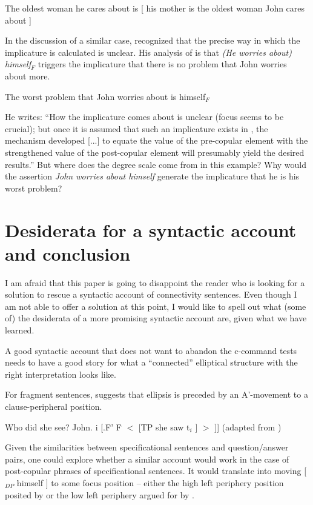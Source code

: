 \documentclass[output=paper,colorlinks,citecolor=brown,draft,draftmode]{langscibook}
\begin{document}
\ea \label{repp}The oldest woman he cares about is [ his mother is the oldest woman John cares about ]
\z

In the discussion of a similar case, \citet{schlenker2003clausalequation}  recognized that the precise way in which the implicature is calculated is unclear. His analysis of  is that  \textit{(He worries about) himself$_F$} triggers the implicature that  there is no problem that John worries about more.

\ea \label{theworstproblem}The worst problem that John worries about is himself$_F$
\z

He writes: ``How the implicature comes about is unclear (focus seems to be crucial); but once it is assumed that such an implicature exists in , the mechanism developed [...] to equate the value of the pre-copular element with the strengthened value of the post-copular element will presumably yield the desired results.'' But where does the degree scale come from in this example? Why would the assertion \textit{John worries about himself} generate  the implicature that he is his worst problem?


\section{Desiderata for a syntactic account and conclusion}
\label{secdesiderata}

I am afraid that this paper is going to disappoint the reader who is looking for a solution to rescue a syntactic account of connectivity sentences. Even though I am not able to offer a solution at this point, I would like to spell out what (some of) the desiderata of a more promising syntactic account are, given what we have learned.

A good syntactic account that does not want to abandon the c-command tests needs to have a good story for what a ``connected'' elliptical structure with the right interpretation looks like.



For fragment sentences, \citet{merchant2004fragmentsandellipsis} suggests that ellipsis is preceded by an A'-movement to a clause-peripheral position.

\ea
\ea  Who did she see? John.
\ex  [FP [DP John ]i [.F' F $<$ [TP she saw t$_i$ ] $>$ ]] \hfill (adapted from \citet{merchant2004fragmentsandellipsis})
\z
\z

Given the similarities between specificational sentences and question/answer pairs, one could explore whether a similar account would work in the case of  post-copular phrases of specificational sentences. It would translate into moving [$_{DP}$ himself ]  to some focus position -- either the high left periphery position posited by  \citet{rizzi1997fine}  or the low left periphery  argued for by \citet{belletti2001inversion}.
\end{document}
